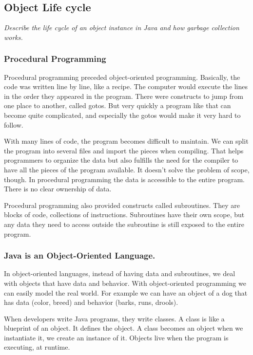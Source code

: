 \subsection{Object Life cycle}
\begin{center}\textit{Describe the life cycle of an object instance in Java and how garbage collection works.}\end{center}

\subsubsection{Procedural Programming} 
Procedural programming preceded object-oriented programming. Basically, the code was written line by line, like a recipe. The computer would execute the lines in the order they appeared in the program. There were constructs to jump from one place to another, called gotos. But very quickly a program like that can become quite complicated, and especially the gotos would make it very hard to follow. 

With many lines of code, the program becomes difficult to maintain. We can split the program into several files and import the pieces when compiling. That helps programmers to organize the data but also fulfills the need for the compiler to have all the pieces of the program available. It doesn't solve the problem of scope, though. In procedural programming the data is accessible to the entire program. There is no clear ownership of data.

Procedural programming also provided constructs called subroutines. They are blocks of code, collections of instructions. Subroutines have their own scope, but any data they need to access outside the subroutine is still exposed to the entire program.

\subsubsection{Java is an Object-Oriented Language.} In object-oriented languages, instead of having data and subroutines, we deal with objects that have data and behavior. With object-oriented programming we can easily model the real world. For example we can have an object of a dog that has data (color, breed) and behavior (barks, runs, drools). 

When developers write Java programs, they write classes. A class is like a blueprint of an object. It defines the object. A class becomes an object when we instantiate it, we create an instance of it. Objects live when the program is executing, at runtime.

